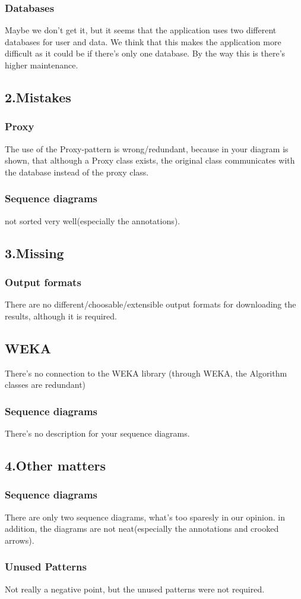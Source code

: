 \documentclass{article}
\begin{document}
\subsubsection{Databases}
Maybe we don't get it, but it seems that the application uses two different databases for user and data. We think that this makes the application more difficult as it could be if there's only one database. By the way this is there's higher maintenance.
\subsection{2.Mistakes}
\subsubsection{Proxy}
The use of the Proxy-pattern is wrong/redundant, because in your diagram is shown, that although a Proxy class exists, the original class communicates with the database instead of the proxy class.
\subsubsection{Sequence diagrams}
 not sorted very well(especially the annotations).
\subsection{3.Missing}
\subsubsection{Output formats}
There are no different/choosable/extensible output formats for downloading the results, although it is required.
\subsection{WEKA}
There's no connection to the WEKA library (through WEKA, the Algorithm classes are redundant)
\subsubsection{Sequence diagrams}
There's no description for your sequence diagrams.
\subsection{4.Other matters}
\subsubsection{Sequence diagrams}
There are only two sequence diagrams, what's too sparesly in our opinion.
in addition, the diagrams are not neat(especially the annotations and crooked arrows).
\subsubsection{Unused Patterns}
Not really a negative point, but the unused patterns were not required.
\end{document}
